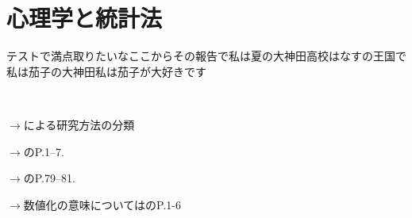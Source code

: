 \section{心理学と統計法}
\label{text01}
テストで満点取りたいなここからその報告で私は夏の大神田高校はなすの王国で私は茄子の大神田私は茄子が大好きです


\begin{flushright}
    $\to$\citet{下山2001}による研究方法の分類
\end{flushright}

\begin{flushright}
    $\to$\citet{三浦201705}のP.1--7.
\end{flushright}

\begin{flushright}
    $\to$\citet{三浦201705}のP.79--81.
\end{flushright}

\begin{flushright}
    $\to$数値化の意味については\citet{川端201408}のP.1-6
\end{flushright}


